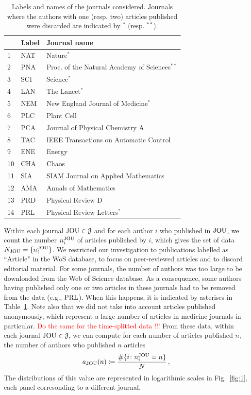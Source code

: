 \documentclass[aps,prl,floatfix,twocolumn]{revtex4-1}
\begin{document}
\begin{table}
 \begin{tabular}{l|l|l}
  & Label & Journal name \\
  \hline
  \hline 1 & NAT & Nature$^*$ \\
  \hline 2 & PNA & Proc. of the Natural Academy of Sciences$^{**}$ \\
  \hline 3 & SCI & Science$^*$ \\
  \hline 4 & LAN & The Lancet$^*$ \\
  \hline 5 & NEM & New England Journal of Medicine$^*$ \\
  \hline 6 & PLC & Plant Cell \\
  \hline 7 & PCA & Journal of Physical Chemistry A \\
  \hline 8 & TAC & IEEE Transactions on Automatic Control \\
  \hline 9 & ENE & Energy \\
  \hline 10 & CHA & Chaos \\
  \hline 11 & SIA & SIAM Journal on Applied Mathematics \\
  \hline 12 & AMA & Annals of Mathematics \\
  \hline 13 & PRD & Physical Review D \\
  \hline 14 & PRL & Physical Review Letters$^*$ 
 \end{tabular}
 \caption{Labels and names of the journals considered. 
 Journals where the authors with one (resp. two) articles published were discarded are indicated by $^*$ (resp. $^{**}$).}
 \label{tab:journals}
\end{table}

Within each journal ${\rm JOU}\in {\cal J}$ and for each author $i$ who published in ${\rm JOU}$, we count the number $n^{\rm JOU}_i$ of articles published by $i$, which gives the set of data $N_{\rm JOU}=\{n^{\rm JOU}_i\}$. 
We restricted our investigation to publications labelled as ``Article'' in the WoS database, to focus on peer-reviewed articles and to discard editorial material. 
For some journals, the number of authors was too large to be downloaded from the Web of Science database. 
As a consequence, some authors having published only one or two articles in these journals had to be removed from the data (e.g., ${\rm PRL}$). 
When this happens, it is indicated by asteriscs in Table~\ref{tab:journals}.
Note also that we did not take into account articles published anonymously, which represent a large number of articles in medicine journals in particular. 
\textcolor{red}{Do the same for the time-splitted data !!!}
From these data, within each journal ${\rm JOU}\in{\cal J}$, we can compute for each number of articles published $n$, the number of authors who published $n$ articles 
\begin{align}
 a_{\rm JOU}(n)\coloneqq\frac{\#\{i\colon n^{\rm JOU}_i = n\}}{N}\, ,
\end{align}
The distributions of this value are represented in logarithmic scales in Fig.~\ref{fig:1}, each panel corresonding to a different journal. 
\end{document}
